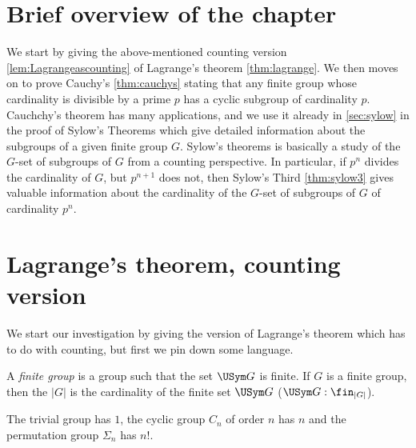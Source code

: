 
\section{Brief overview of the chapter}
\label{sec:fingp-overview}
We start by giving the above-mentioned counting version \cref{lem:Lagrangeascounting} of Lagrange's theorem \cref{thm:lagrange}.  
We then moves on to prove Cauchy's \cref{thm:cauchys} stating that any finite group whose cardinality is divisible by a prime $p$ has a cyclic subgroup of cardinality $p$.
Cauchchy's theorem has many applications, and we use it already in \cref{sec:sylow} in the proof of Sylow's Theorems which give detailed information about the subgroups of a given finite group $G$.  Sylow's theorems is basically a study of the $G$-set of subgroups of $G$ from a counting perspective.  
In particular, if $p^n$ divides the cardinality of $G$, but $p^{n+1}$ does not, then Sylow's Third \cref{thm:sylow3} gives valuable information about the cardinality of the $G$-set of subgroups of $G$ of cardinality $p^n$.


\section{Lagrange's theorem, counting version}
\label{sec:Lagrangecounting}

We start our investigation by giving the version of Lagrange's theorem which has to do with counting, but first we pin down some language.
\begin{definition}
  \label{def:finitegrd}
A \emph{finite group} is a group such that the set $\USym G$ is finite.   If $G$ is a finite group, then the \emph{\gporder}\index{\gporder} $|G|$ is the cardinality of the finite set $\USym G$ (\ie $\USym G:\fin_{|G|}$).
\end{definition}
\begin{example}
  The trivial group has \gporder $1$, the cyclic group $C_n$ of order $n$ has \gporder $n$ %
and the permutation group $\Sigma_n$ has \gporder $n!$.
\end{example}


